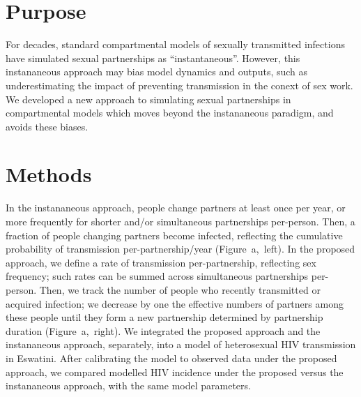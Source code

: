 \section{Purpose}
For decades, standard compartmental models of sexually transmitted infections
have simulated sexual partnerships as ``instantaneous''.
However, this instananeous approach may bias model dynamics and outputs, such as %
underestimating the impact of preventing transmission in the conext of sex work.
We developed a new approach to simulating sexual partnerships in compartmental models
which moves beyond the instananeous paradigm, and avoids these biases.
\section{Methods}
In the instananeous approach, people change partners at least once per year,
or more frequently for shorter and/or simultaneous partnerships per-person.
Then, a fraction of people changing partners become infected,
reflecting the cumulative probability of transmission per-partnership/year (Figure~a,~left).
In the proposed approach, we define a rate of transmission per-partnership, reflecting sex frequency;
such rates can be summed across simultaneous partnerships per-person.
Then, we track the number of people who recently transmitted or acquired infection;
we decrease by one the effective numbers of partners among these people
until they form a new partnership determined by partnership duration (Figure~a,~right).
We integrated the proposed approach and the instananeous approach, separately,
into a model of heterosexual HIV transmission in Eswatini.
After calibrating the model to observed data under the proposed approach,
we compared modelled HIV incidence under the proposed versus the instananeous approach,
with the same model parameters.
